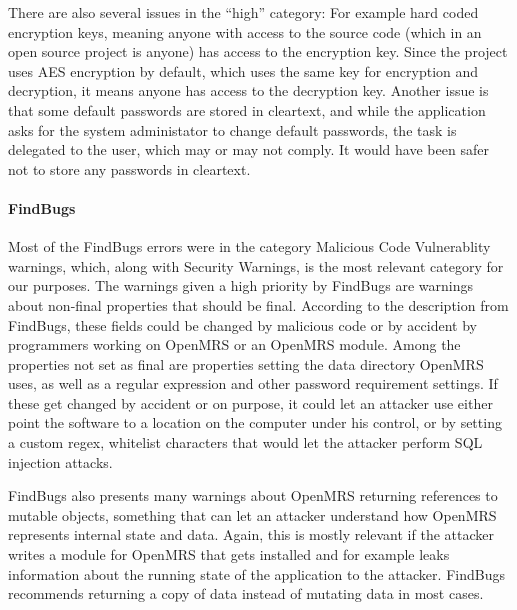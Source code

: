 \documentclass{report} %
\begin{document}
There are also several issues in the ``high'' category: For example hard coded
encryption keys, meaning anyone with access to the source code (which in an open
source project is anyone) has access to the encryption key. Since the project
uses AES encryption by default, which uses the same key for encryption and
decryption, it means anyone has access to the decryption key. Another issue is
that some default passwords are stored in cleartext, and while the application
asks for the system administator to change default passwords, the task is
delegated to the user, which may or may not comply. It would have been safer not
to store any passwords in cleartext. 

\paragraph{FindBugs}
Most of the FindBugs errors were in the category Malicious Code Vulnerablity
warnings, which, along with Security Warnings, is the most relevant category
for our purposes. The warnings given a high priority by FindBugs are warnings
about non-final properties that should be final. According to the description
from FindBugs, these fields could be changed by malicious code or by accident by
programmers working on OpenMRS or an OpenMRS module. Among the properties not
set as final are properties setting the data directory OpenMRS uses, as well as
a regular expression and other password requirement settings. If these get
changed by accident or on purpose, it could let an attacker use either point the
software to a location on the computer under his control, or by setting a custom
regex, whitelist characters that would let the attacker perform SQL injection attacks.

FindBugs also presents many warnings about OpenMRS returning references to
mutable objects, something that can let an attacker understand how OpenMRS
represents internal state and data. Again, this is mostly relevant if the
attacker writes a module for OpenMRS that gets installed and for example leaks
information about the running state of the application to the attacker. FindBugs
recommends returning a copy of data instead of mutating data in most cases. 
\end{document}
